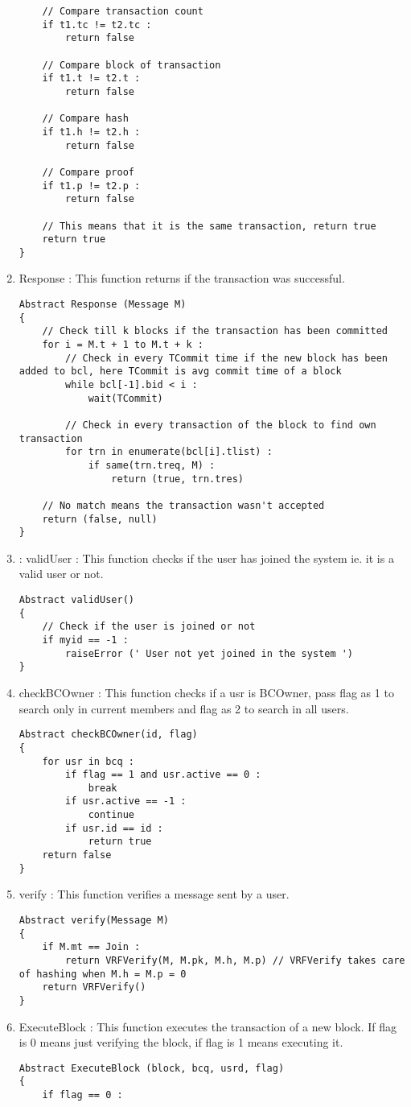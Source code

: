 \begin{enumerate}
\begin{lstlisting}
    // Compare transaction count
    if t1.tc != t2.tc :
        return false

    // Compare block of transaction
    if t1.t != t2.t :
        return false
    
    // Compare hash
    if t1.h != t2.h :
        return false
    
    // Compare proof
    if t1.p != t2.p :
        return false

    // This means that it is the same transaction, return true
    return true
}
    \end{lstlisting}
    \item Response : This function returns if the transaction was successful.
    \begin{lstlisting}
Abstract Response (Message M)
{
    // Check till k blocks if the transaction has been committed
    for i = M.t + 1 to M.t + k :
        // Check in every TCommit time if the new block has been added to bcl, here TCommit is avg commit time of a block
        while bcl[-1].bid < i :
            wait(TCommit)
        
        // Check in every transaction of the block to find own transaction
        for trn in enumerate(bcl[i].tlist) :
            if same(trn.treq, M) :
                return (true, trn.tres)
    
    // No match means the transaction wasn't accepted
    return (false, null)
}
    \end{lstlisting}
    \item : validUser : This function checks if the user has joined the system ie. it is a valid user or not.
    \begin{lstlisting}
Abstract validUser()
{
    // Check if the user is joined or not
    if myid == -1 :
        raiseError (' User not yet joined in the system ')
}
    \end{lstlisting}
    \item checkBCOwner : This function checks if a usr is BCOwner, pass flag as 1 to search only in current members and flag as 2 to search in all users.
    \begin{lstlisting}
Abstract checkBCOwner(id, flag)
{
    for usr in bcq :
        if flag == 1 and usr.active == 0 :
            break
        if usr.active == -1 :
            continue
        if usr.id == id :
            return true
    return false
}
    \end{lstlisting}
    \item verify : This function verifies a message sent by a user.
    \begin{lstlisting}
Abstract verify(Message M)
{
    if M.mt == Join :
        return VRFVerify(M, M.pk, M.h, M.p) // VRFVerify takes care of hashing when M.h = M.p = 0
    return VRFVerify()
}
    \end{lstlisting}
    \item ExecuteBlock : This function executes the transaction of a new block. If flag is 0 means just verifying the block, if flag is 1 means executing it.
    \begin{lstlisting}
Abstract ExecuteBlock (block, bcq, usrd, flag)
{
    if flag == 0 :


\end{lstlisting}
\end{enumerate}

